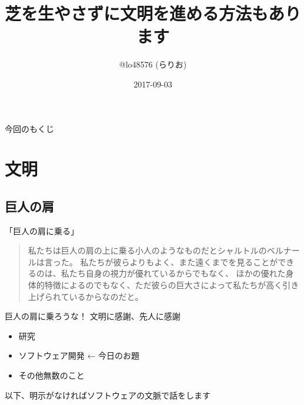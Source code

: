 \documentclass[
        unicode%
    ]{beamer}
\title[文明人]{芝を生やさずに文明を進める方法もあります}
\author{@lo48576 (らりお)}
\institute{ロボット技術研究会}
\date{2017-09-03}
\begin{document}
\frame{\titlepage}

\begin{frame}{今回のもくじ}
    \tableofcontents
\end{frame}

\section{文明}

\subsection{巨人の肩}

\begin{frame}{「巨人の肩に乗る」}
    \begin{quote}
        私たちは巨人の肩の上に乗る小人のようなものだとシャルトルのベルナールは言った。
        私たちが彼らよりもよく、また遠くまでを見ることができるのは、私たち自身の視力が優れているからでもなく、
        ほかの優れた身体的特徴によるのでもなく、ただ彼らの巨大さによって私たちが高く引き上げられているからなのだと。

        \vspace{\baselineskip}
        \hspace*{}
    \end{quote}
\end{frame}

\begin{frame}{巨人の肩に乗ろうな！}
    文明に感謝、先人に感謝

    \begin{itemize}
        \item 研究
        \item ソフトウェア開発 ← 今日のお題
        \item その他無数のこと
    \end{itemize}

    以下、明示がなければソフトウェアの文脈で話をします
\end{frame}
\end{document}
